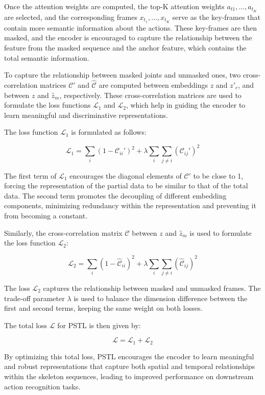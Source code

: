 Once the attention weights are computed, the top-K attention weights \(a_{t1}, ..., a_{t_K}\) are selected, and the corresponding frames \(x_{t_1}, ..., x_{t_K}\) serve as the key-frames that contain more semantic information about the actions. These key-frames are then masked, and the encoder is encouraged to capture the relationship between the feature from the masked sequence and the anchor feature, which contains the total semantic information.

To capture the relationship between masked joints and unmasked ones, two cross-correlation matrices \(\mathcal{C}'\) and \(\hat{\mathcal{C}}\) are computed between embeddings \(z\) and \(z'_c\), and between \(z\) and \(\hat{z}_m\), respectively. These cross-correlation matrices are used to formulate the loss functions \(\mathcal{L}_1\) and \(\mathcal{L}_2\), which help in guiding the encoder to learn meaningful and discriminative representations.

The loss function \(\mathcal{L}_1\) is formulated as follows:

\[ \mathcal{L}_1 = \sum_i \left(1 - \mathcal{C}_{ii}'\right)^2 + \lambda \sum_i \sum_{j \neq i} \left(\mathcal{C}_{ij}'\right)^2 \]

The first term of \(\mathcal{L}_1\) encourages the diagonal elements of \(\mathcal{C}'\) to be close to 1, forcing the representation of the partial data to be similar to that of the total data. The second term promotes the decoupling of different embedding components, minimizing redundancy within the representation and preventing it from becoming a constant.

Similarly, the cross-correlation matrix \(\hat{\mathcal{C}}\) between \(z\) and \(\hat{z}_m\) is used to formulate the loss function \(\mathcal{L}_2\):

\[ \mathcal{L}_2 = \sum_i \left(1 - \hat{\mathcal{C}}_{ii}\right)^2 + \lambda \sum_i \sum_{j \neq i} \left(\hat{\mathcal{C}}_{ij}\right)^2 \]

The loss \(\mathcal{L}_2\) captures the relationship between masked and unmasked frames. The trade-off parameter \(\lambda\) is used to balance the dimension difference between the first and second terms, keeping the same weight on both losses.

The total loss \(\mathcal{L}\) for PSTL is then given by:

\[ \mathcal{L} = \mathcal{L}_1 + \mathcal{L}_2 \]

By optimizing this total loss, PSTL encourages the encoder to learn meaningful and robust representations that capture both spatial and temporal relationships within the skeleton sequences, leading to improved performance on downstream action recognition tasks.


